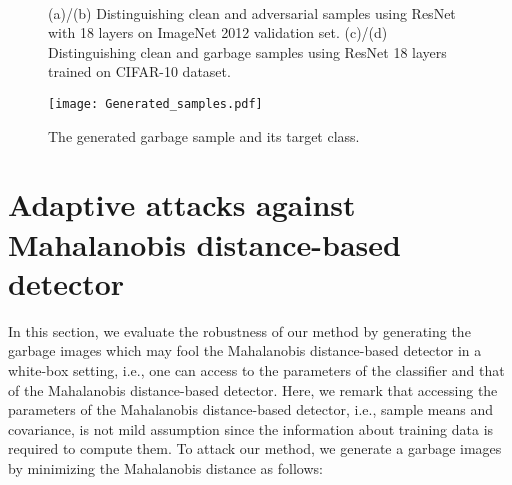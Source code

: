 \documentclass{article}
\newcommand{\cutcaptionup}{\vspace*{-0.1in}}
\newcommand{\cutcaptiondown}{\vspace*{-0.15in}}
\newcommand{\cutcaptionup}{}
\newcommand{\cutcaptiondown}{}
\begin{document}
\begin{figure} [t] \centering
\vspace{-0.1in}
\,
\,
\,
\cutcaptionup
\caption{(a)/(b) Distinguishing clean and adversarial samples using ResNet with 18 layers on ImageNet 2012 validation set. (c)/(d) Distinguishing clean and garbage samples using ResNet 18 layers trained on CIFAR-10 dataset.}
\cutcaptiondown
\vspace{+0.05in}
\label{fig:imagenet_resnet18}
\end{figure}



\begin{figure*} [t] \centering
  \texttt{[image: Generated\_samples.pdf]} 
\caption{The generated garbage sample and its target class.}
\label{fig:garbage}
\end{figure*}

\section{Adaptive attacks against Mahalanobis distance-based detector}

In this section, we evaluate the robustness of our method by generating the garbage images which may fool the Mahalanobis distance-based detector in a white-box setting, i.e., one can access to the parameters of the classifier and that of the Mahalanobis distance-based detector.
Here, we remark that accessing the parameters of the Mahalanobis distance-based detector, i.e., sample means and covariance, is not mild assumption since the information about training data is required to compute them.
To attack our method, we generate a garbage images  by minimizing the Mahalanobis distance as follows:
\end{document}
